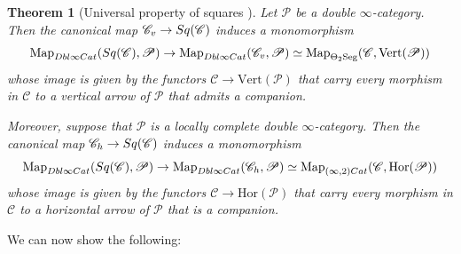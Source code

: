 \documentclass[a4paper, 11pt]{amsart}
\newtheorem{theorem}{Theorem}
\numberwithin{theorem}{section}
\theoremstyle{definition}
\newcommand{\cat}[1]{\textup{#1}}
\newcommand{\map}{\mathrm{Map}}
\newcommand{\Cat}{\cat{Cat}}
\newcommand{\C}{\mathscr{C}}
\renewcommand{\P}{\mathscr{P}}
\renewcommand{\Vert}{\mathrm{Vert}}
\newcommand{\Hor}{\mathrm{Hor}}
\newcommand{\Seg}{\mathrm{Seg}}
\newcommand{\DbliCat}{\cat{Dbl}\infty\cat{Cat}}
\newcommand{\Sq}{\cat{Sq}}
\begin{document}
\begin{theorem}[Universal property of squares \cite{GRconj}]\label{thm.uni-prop-sq}
	Let $\P$ be a double $\infty$-category. Then the canonical map $\C_v \to \Sq(\C)$ induces  a monomorphism 
	$$
	\map_{\DbliCat}(\Sq(\C), \P) \to \map_{\DbliCat}(\C_v, \P) \simeq \map_{\Theta_2\Seg}(\C, \Vert(\P))
	$$
	whose image is given by the functors $\C \to \Vert(\P)$ that carry every morphism in $\C$ to a vertical arrow of $\P$ that admits a companion.

	Moreover, suppose that $\P$ is a locally complete double $\infty$-category. Then the canonical map $\C_h \to \Sq(\C)$ induces  a monomorphism 
	$$
	\map_{\DbliCat}(\Sq(\C), \P) \to \map_{\DbliCat}(\C_h, \P) \simeq \map_{(\infty,2)\Cat}(\C, \Hor(\P))
	$$
	whose image is given by the functors $\C \to \Hor(\P)$ that carry every morphism in $\C$ to a horizontal arrow of $\P$ that is a companion.
\end{theorem}

We can now show the following:
\end{document}
